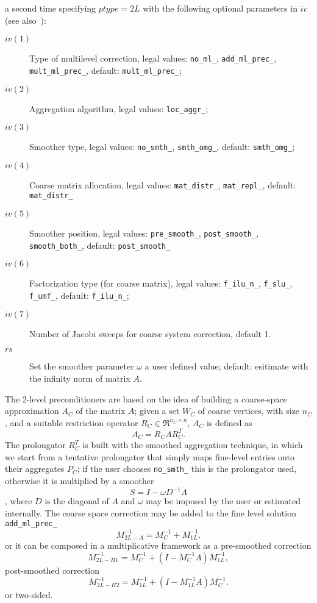 a second time specifying 
$ptype=2L$ with the following optional parameters in $iv$ (see
also~\cite{APNUM06,DD2}): 
\begin{description}
\item[$iv(1)$] Type of multilevel correction, legal values: \verb|no_ml_|,
  \verb|add_ml_prec_|, \verb|mult_ml_prec_|,
  default: \verb|mult_ml_prec_|;
\item[$iv(2)$] Aggregation algorithm, legal values: \verb|loc_aggr_|;
\item[$iv(3)$] Smoother type, legal values: \verb|no_smth_|,
  \verb|smth_omg_|, default: \verb|smth_omg_|;
\item[$iv(4)$] Coarse matrix allocation, legal values:
  \verb|mat_distr_|, \verb|mat_repl_|, default: \verb|mat_distr_|
\item[$iv(5)$] Smoother position, legal values: \verb|pre_smooth_|,
  \verb|post_smooth_|, \verb|smooth_both_|, default:
  \verb|post_smooth_|
\item[$iv(6)$] Factorization type (for coarse matrix), legal values: \verb|f_ilu_n_|,
  \verb|f_slu_|, \verb|f_umf_|, default: \verb|f_ilu_n_|;
\item[$iv(7)$] Number of Jacobi sweeps for coarse system correction,
  default 1.
\item[$rs$] Set the smoother parameter $\omega$ a user defined value;
  default: esitimate with the infinity norm of matrix $A$.
\end{description}
The 2-level preconditioners are based on the idea of building a
coarse-space approximation $A_C$ of the matrix $A$; given a set $W_C$
of coarse vertices, with size $n_C$, and a suitable restriction
operator $R_C \in \Re^{n_C \times n}$, $A_C$ is defined as 
\[
A_C=R_C A R_C^T .
\]
The prolongator $R_C^T$ is built with the smoothed aggregation technique,
in which we start from a tentative prolongator that simply maps
fine-level entries onto their aggregates $P_C$; if the user chooses
\verb|no_smth_| this is the prolongator used, otherwise it is
multiplied by a smoother \[ S = I - \omega D^{-1} A \], where $D$ is
the diagonal of $A$ and  $\omega$ may be imposed by the user or
estimated internally.   
The coarse space correction may be added to the fine level solution
\verb|add_ml_prec_|
\[
M_{2L-A}^{-1} = M_{C}^{-1} + M_{1L}^{-1}. 
\]
or it can be composed  in a multiplicative framework as a pre-smoothed
correction
\[
M_{2L-H1}^{-1} = M_{C}^{-1} + \left( I - M_{C}^{-1}A \right) M_{1L}^{-1}, 
\]
post-smoothed correction
\[
M_{2L-H2}^{-1} = M_{1L}^{-1} + \left( I - M_{1L}^{-1}A \right) M_{C}^{-1}. 
\]
or two-sided. 



